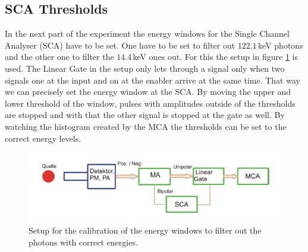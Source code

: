 \documentclass[30pt,a4paper]{article}
\begin{document}
 	\subsection{SCA Thresholds}
 	In the next part of the experiment the energy windows for the Single Channel Analyser (SCA) have to be set. One have to be set to filter out $122.1$\,keV photons and the other one to filter the $14.4$\,keV ones out. For this the setup in figure \ref{setup_EW} is used. The Linear Gate in the setup only lets through a signal only when two signals one at the input and on at the enabler arrive at the same time. That way we can precisely set the energy window at the SCA. By moving the upper and lower threshold of the window, pulses with amplitudes outside of the thresholds are stopped and with that the other signal is stopped at the gate as well. By watching the histogram created by the MCA the thresholds can be set to the correct energy levels. \cite{Anleitung}
 	\begin{figure}[h]
 		\includegraphics{Bilder/Circuit_ES_calib}
 		\centering
 		\caption[Energy Spectrum Setup]{\small Setup for the calibration of the energy windows to filter out the photons with correct energies. \cite{Anleitung}}
 		\label{setup_EW}
 	\end{figure}\\
 	\FloatBarrier
\end{document}
